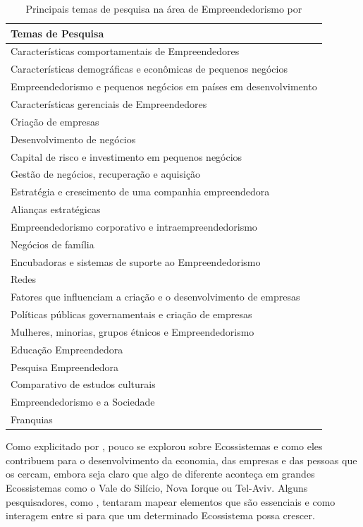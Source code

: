 \begin{table}[!htb]
	\centering
	\label{tabela:principais_temas_de_pesquisa_na_area_de_empreendedorismo}
	\begin{tabular}{ | p{15cm} |}
		\hline
		Temas de Pesquisa \\ \hline
		Características comportamentais de Empreendedores \\ \hline
		Características demográficas e econômicas de pequenos negócios \\ \hline
		Empreendedorismo e pequenos negócios em países em desenvolvimento \\ \hline
		Características gerenciais de Empreendedores \\ \hline
		Criação de empresas \\ \hline
		Desenvolvimento de negócios \\ \hline
		Capital de risco e investimento em pequenos negócios \\ \hline
		Gestão de negócios, recuperação e aquisição \\ \hline
		Estratégia e crescimento de uma companhia empreendedora \\ \hline
		Alianças estratégicas \\ \hline
		Empreendedorismo corporativo e intraempreendedorismo \\ \hline
		Negócios de família \\ \hline
		Encubadoras e sistemas de suporte ao Empreendedorismo \\ \hline
		Redes \\ \hline
		Fatores que influenciam a criação e o desenvolvimento de empresas \\ \hline
		Políticas públicas governamentais e criação de empresas \\ \hline
		Mulheres, minorias, grupos étnicos e Empreendedorismo \\ \hline
		Educação Empreendedora \\ \hline
		Pesquisa Empreendedora \\ \hline
		Comparativo de estudos culturais\\ \hline
		Empreendedorismo e a Sociedade \\ \hline
		Franquias \\ \hline
	\end{tabular}
	\caption{Principais temas de pesquisa na área de Empreendedorismo por \cite{Filion1998}}
\end{table}

Como explicitado por , pouco se explorou sobre Ecossistemas e como eles contribuem para o desenvolvimento da economia, das empresas e das pessoas que os cercam, embora seja claro que algo de diferente aconteça em grandes Ecossistemas como o Vale do Silício, Nova Iorque ou Tel-Aviv. Alguns pesquisadores, como , tentaram mapear elementos que são essenciais e como interagem entre si para que um determinado Ecossistema possa crescer.

